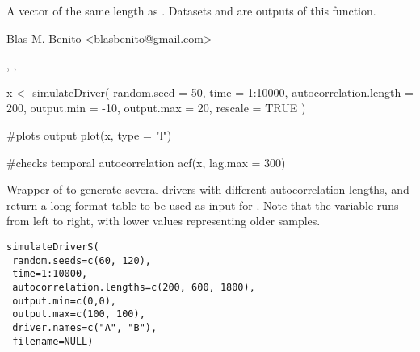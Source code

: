 \documentclass[letterpaper]{book}
\begin{document}
%
\begin{Value}
A vector of the same length as . Datasets  and  are outputs of this function.
\end{Value}
%
\begin{Author}\relax
Blas M. Benito  <blasbenito@gmail.com>
\end{Author}
%
\begin{SeeAlso}\relax
{}, , 
\end{SeeAlso}
%
\begin{Examples}
\begin{ExampleCode}

x <- simulateDriver(
  random.seed = 50,
  time = 1:10000,
  autocorrelation.length = 200,
  output.min = -10,
  output.max = 20,
  rescale = TRUE
  )

#plots output
plot(x, type = "l")

#checks temporal autocorrelation
acf(x, lag.max = 300)

\end{ExampleCode}
\end{Examples}
%
\begin{Description}\relax
Wrapper of  to generate several drivers with different autocorrelation lengths, and return a long format table to be used as input for . Note that the variable  runs from left to right, with lower values representing older samples.
\end{Description}
%
\begin{Usage}
\begin{verbatim}
simulateDriverS(
 random.seeds=c(60, 120),
 time=1:10000,
 autocorrelation.lengths=c(200, 600, 1800),
 output.min=c(0,0),
 output.max=c(100, 100),
 driver.names=c("A", "B"),
 filename=NULL)
\end{verbatim}
\end{Usage}
%
\end{document}
